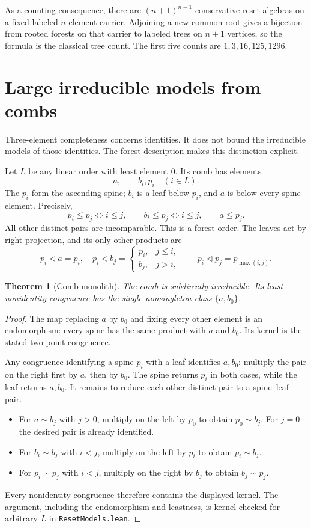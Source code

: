 \documentclass[11pt]{article}
\newtheorem{theorem}{Theorem}[section]
\newcommand{\del}{\mathbin{\triangleleft}}
\begin{document}
As a counting consequence, there are $(n+1)^{n-1}$ conservative reset
algebras on a fixed labeled $n$-element carrier. Adjoining a new common
root gives a bijection from rooted forests on that carrier to labeled
trees on $n+1$ vertices, so the formula is the classical tree count.
The first five counts are $1,3,16,125,1296$.

\section{Large irreducible models from combs}

Three-element completeness concerns identities. It does not bound the
irreducible models of those identities. The forest description makes
this distinction explicit.

Let $L$ be any linear order with least element $0$. Its comb has
elements
\[
 a,\qquad b_i, p_i\quad(i\in L).
\]
The $p_i$ form the ascending spine; $b_i$ is a leaf below $p_i$,
and $a$ is below every spine element. Precisely,
\[
 p_i\leq p_j\Longleftrightarrow i\leq j,\qquad
 b_i\leq p_j\Longleftrightarrow i\leq j,\qquad a\leq p_j.
\]
All other distinct pairs are incomparable. This is a forest order.
The leaves act by right projection, and its only other products are
\[
 p_i\del a=p_i,\quad
 p_i\del b_j=
 \begin{cases}p_i,&j\leq i,\\b_j,&j>i,\end{cases}\qquad
 p_i\del p_j=p_{\max(i,j)}.
\]

\begin{theorem}[Comb monolith]\label{thm:comb}
The comb is subdirectly irreducible. Its least nonidentity congruence
has the single nonsingleton class $\{a,b_0\}$.
\end{theorem}
\begin{proof}
The map replacing $a$ by $b_0$ and fixing every other element is an
endomorphism: every spine has the same product with $a$ and $b_0$.
Its kernel is the stated two-point congruence.

Any congruence identifying a spine $p_i$ with a leaf identifies $a,b_0$:
multiply the pair on the right first by $a$, then by $b_0$.
The spine returns $p_i$ in both cases, while the leaf returns $a,b_0$.
It remains to reduce each other distinct pair to a spine--leaf pair.
\begin{itemize}
\item For $a\sim b_j$ with $j>0$, multiply on the left by $p_0$ to
obtain $p_0\sim b_j$. For $j=0$ the desired pair is already identified.
\item For $b_i\sim b_j$ with $i<j$, multiply on the left by $p_i$ to
obtain $p_i\sim b_j$.
\item For $p_i\sim p_j$ with $i<j$, multiply on the right by $b_j$
to obtain $b_j\sim p_j$.
\end{itemize}
Every nonidentity congruence therefore contains the displayed kernel.
The argument, including the endomorphism and leastness, is
kernel-checked for arbitrary $L$ in \texttt{ResetModels.lean}.
\end{proof}
\end{document}
